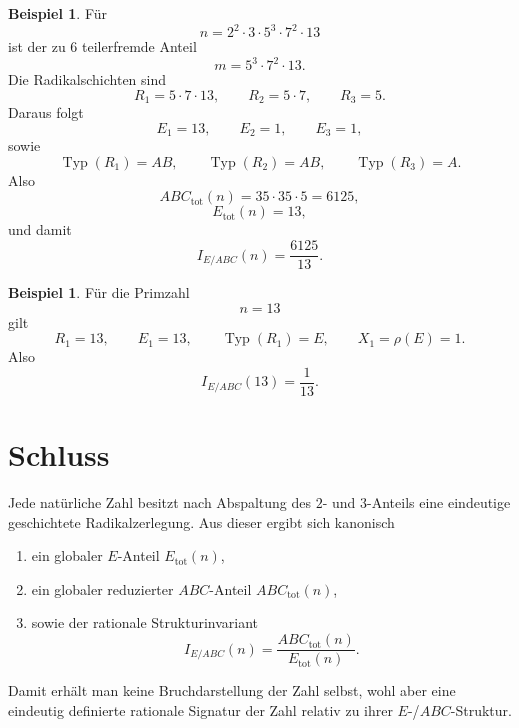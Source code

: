 \documentclass[11pt,a4paper]{article}
\theoremstyle{definition}
\newtheorem{beispiel}[satz]{Beispiel}
\theoremstyle{remark}
\newcommand{\Typ}{\operatorname{Typ}}
\begin{document}
	\begin{beispiel}
		Für
		\[
		n=2^2\cdot 3\cdot 5^3\cdot 7^2\cdot 13
		\]
		ist der zu \(6\) teilerfremde Anteil
		\[
		m=5^3\cdot 7^2\cdot 13.
		\]
		Die Radikalschichten sind
		\[
		R_1=5\cdot 7\cdot 13,\qquad
		R_2=5\cdot 7,\qquad
		R_3=5.
		\]
		Daraus folgt
		\[
		E_1=13,\qquad E_2=1,\qquad E_3=1,
		\]
		sowie
		\[
		\Typ(R_1)=AB,\qquad \Typ(R_2)=AB,\qquad \Typ(R_3)=A.
		\]
		Also
		\[
		ABC_{\mathrm{tot}}(n)=35\cdot 35\cdot 5=6125,
		\]
		\[
		E_{\mathrm{tot}}(n)=13,
		\]
		und damit
		\[
		I_{E/ABC}(n)=\frac{6125}{13}.
		\]
	\end{beispiel}
	
	\begin{beispiel}
		Für die Primzahl
		\[
		n=13
		\]
		gilt
		\[
		R_1=13,\qquad E_1=13,\qquad \Typ(R_1)=E,\qquad X_1=\rho(E)=1.
		\]
		Also
		\[
		I_{E/ABC}(13)=\frac{1}{13}.
		\]
	\end{beispiel}
	
	\section{Schluss}
	
	Jede natürliche Zahl besitzt nach Abspaltung des \(2\)- und \(3\)-Anteils eine eindeutige
	geschichtete Radikalzerlegung. Aus dieser ergibt sich kanonisch
	
	\begin{enumerate}[label=\arabic*.]
		\item ein globaler \(E\)-Anteil \(E_{\mathrm{tot}}(n)\),
		\item ein globaler reduzierter \(ABC\)-Anteil \(ABC_{\mathrm{tot}}(n)\),
		\item sowie der rationale Strukturinvariant
		\[
		I_{E/ABC}(n)=\frac{ABC_{\mathrm{tot}}(n)}{E_{\mathrm{tot}}(n)}.
		\]
	\end{enumerate}
	
	Damit erhält man keine Bruchdarstellung der Zahl selbst, wohl aber eine eindeutig definierte
	rationale Signatur der Zahl relativ zu ihrer \(E\)-/\(ABC\)-Struktur.
	
\end{document}
